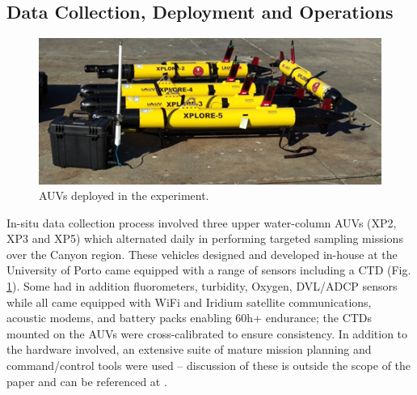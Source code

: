 \subsection{Data Collection, Deployment and Operations}


\begin{figure}
    \centering
    \includegraphics[width=.7\linewidth]{fig/lauvs.png}
    \caption{AUVs deployed in the \proj experiment.}
    \label{fig:lauvs}
\end{figure}

In-situ data collection process involved three upper water-column AUVs
(XP2, XP3 and XP5) which alternated daily in performing targeted
sampling missions over the \naz Canyon region. These vehicles designed
and developed in-house at the University of Porto \cite{sousa2012lauv}
came equipped with a range of sensors including a CTD
(Fig. \ref{fig:lauvs}). Some had in addition fluorometers, turbidity,
Oxygen, DVL/ADCP sensors while all came equipped with WiFi and Iridium
satellite communications, acoustic modems, and battery packs enabling
60h+ endurance; the CTDs mounted on the AUVs were cross-calibrated to
ensure consistency. In addition to the hardware involved, an extensive
suite of mature mission planning and command/control tools were used
-- discussion of these is outside the scope of the paper and can be
referenced at
\cite{dias2005neptus,seacons10,toolchain2012,pinto2013lsts,Ferreira2018}.



